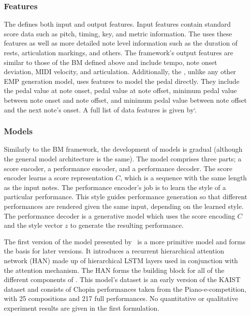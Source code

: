 \subsubsection{Features}
The \vnetf{} defines both input and output features. Input features contain standard score data such as pitch, timing, key, and metric information. The \vnetf{} uses these features as well as more detailed note level information such as the duration of rests, articulation markings, and others. The framework's output features are similar to those of the BM defined above and include tempo, note onset deviation, MIDI velocity, and articulation. Additionally, the \vnetf{}, unlike any other EMP generation model, uses features to model the pedal directly. They include the pedal value at note onset, pedal value at note offset, minimum pedal value between note onset and note offset, and minimum pedal value between note offset and the next note's onset. A full list of data features is given by`\citet{jeong2019score}. 

\subsubsection{Models}
Similarly to the BM framework, the development of \vnet{} models is gradual (although the general model architecture is the same). The model comprises three parts; a score encoder, a performance encoder, and a performance decoder. The score encoder learns a score representation $C$, which is a sequence with the same length as the input notes. The performance encoder's job is to learn the style of a particular performance. This style guides performance generation so that different performances are rendered given the same input, depending on the learned style. The performance decoder is a generative model which uses the score encoding $C$ and the style vector $z$ to generate the resulting performance. 

The first version of the model presented by~\citet{jeong2018virtuosonet} is a more primitive model and forms the basis for later versions. It introduces a recurrent hierarchical attention network (HAN) made up of hierarchical LSTM layers used in conjunction with the attention mechanism. The HAN forms the building block for all of the different components of \vnet{}. This model's dataset is an early version of the KAIST dataset and consists of Chopin performances taken from the Piano-e-competition, with 25 compositions and 217 full performances. No quantitative or qualitative experiment results are given in the first formulation. 

